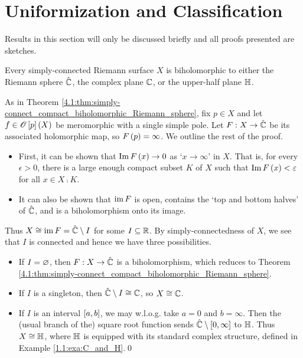 \documentclass[../Moduli_Spaces_of_Riemann_Surfaces.tex]{subfiles}
\begin{document}
    \section{Uniformization and Classification}\label{sec:uniformization}
    Results in this section will only be discussed briefly and all proofs presented are sketches.
    \begin{theorem}[Uniformization]
        Every simply-connected Riemann surface $X$ is biholomorphic to either the Riemann sphere $\RS$, the complex plane $\C$, or the upper-half plane $\H$.
    \end{theorem}
    \begin{proofsketch}
        As in Theorem \ref{4.1:thm:simply-connect_compact_biholomorphic_Riemann_sphere}, fix $p\in X$ and let $f\in\HOLO\l[p\r]\l(X\r)$ be meromorphic with a single simple pole. Let $F:X\to\RS$ be its associated holomorphic map, so $F\l(p\r)=\infty$. We outline the rest of the proof.
        \begin{itemize}
            \item First, it can be shown that $\Im F\l(x\r)\to0$ as `$x\to\infty$' in $X$. That is, for every $\epsilon>0$, there is a large enough compact subset $K$ of $X$ such that $\Im F\l(x\r)<\epsilon$ for all $x\in X\comp K$.
                \vspace{-0.05in}
            \item It can also be shown that $\im F$ is open, contains the `top and bottom halves' of $\RS$, and is a biholomorphism onto its image.
        \end{itemize}
        Thus $X\iso\im F=\RS\comp I$ for some $I\subseteq\R$. By simply-connectedness of $X$, we see that $I$ is connected and hence we have three possibilities.
        \begin{itemize}
            \item If $I=\em$, then $F:X\to\RS$ is a biholomorphism, which reduces to Theorem \ref{4.1:thm:simply-connect_compact_biholomorphic_Riemann_sphere}.
                \vspace{-0.05in}
            \item If $I$ is a singleton, then $\RS\comp I\iso\C$, so $X\iso\C$.
                \vspace{-0.05in}
            \item If $I$ is an interval $\l[a,b\r]$, we may w.l.o.g. take $a=0$ and $b=\infty$. Then the (usual branch of the) square root function sends $\RS\comp\l[0,\infty\r]$ to $\H$. Thus $X\iso\H$, where $\H$ is equipped with its standard complex structure, defined in Example \ref{1.1:exa:C_and_H}.\qed
        \end{itemize}
    \end{proofsketch}
\end{document}
